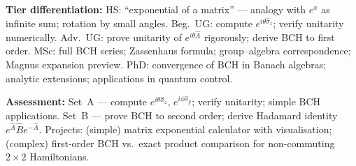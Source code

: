 \documentclass[11pt,a4paper]{article}
\begin{document}
\begin{tcolorbox}[modulebox, title={Module~I.1 --- Lecture L04: Operator Algebra and the Exponential Map}]
\medskip\textbf{Tier differentiation:}
HS: ``exponential of a matrix'' --- analogy with $e^x$ as infinite sum; rotation by small angles.
Beg.\ UG: compute $e^{i\theta\hat{\sigma}_z}$; verify unitarity numerically.
Adv.\ UG: prove unitarity of $e^{i\theta\hat{A}}$ rigorously; derive BCH to first order.
MSc: full BCH series; Zassenhaus formula; group--algebra correspondence; Magnus expansion preview.
PhD: convergence of BCH in Banach algebras; analytic extensions; applications in quantum control.

\medskip\textbf{Assessment:}
Set~A --- compute $e^{i\theta\hat{\sigma}_z}$, $e^{i\phi\hat{\sigma}_y}$; verify unitarity; simple BCH applications.
Set~B --- prove BCH to second order; derive Hadamard identity $e^{\hat{A}}\hat{B}e^{-\hat{A}}$.
Projects: (simple) matrix exponential calculator with visualisation; (complex) first-order BCH vs.\ exact
product comparison for non-commuting $2\times 2$ Hamiltonians.
\end{tcolorbox}

\medskip
\end{document}
